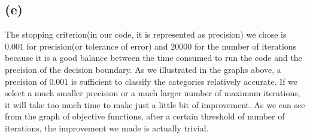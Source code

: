 \documentclass[12pt]{article}
\begin{document}
\subsection*{(e)}
The stopping criterion(in our code, it is represented as precision) we chose is $0.001$ for precision(or tolerance of error) and $20000$ for the number of iterations because it is a good balance between the time consumed to run the code and the precision of the decision boundary. As we illustrated in the graphs above, a precision of 
$0.001$ is sufficient to classify the categories relatively accurate. If we select a much smaller precision or a much larger number of maximum iterations, it will take too much time to make just a little bit of improvement. As we can see from the graph of objective functions, after a certain threshold of 
number of iterations, the improvement we made is actually trivial. 
\end{document}
